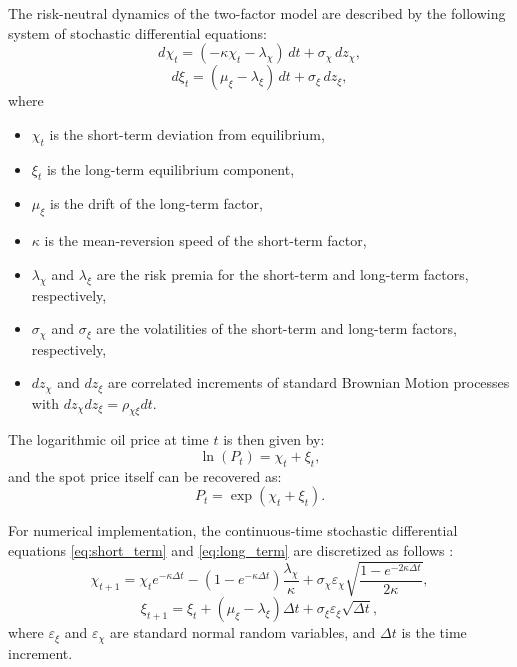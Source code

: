 \documentclass[pdflatex,sn-basic]{sn-jnl}%
\theoremstyle{thmstyleone}%
\theoremstyle{thmstyletwo}%
\theoremstyle{thmstylethree}%
\begin{document}
The risk-neutral dynamics of the two-factor model are described by the following system of stochastic differential equations:
\begin{equation}
    d\chi_t = (-\kappa \chi_t - \lambda_\chi)\,dt + \sigma_\chi\, d z_\chi, 
\label{eq:short_term}
\end{equation}
\begin{equation}
    d\xi_t = (\mu_\xi - \lambda_\xi)\,dt + \sigma_\xi\, d z_\xi, 
\label{eq:long_term}
\end{equation}
where
\begin{itemize}
    \item $\chi_t$ is the short-term deviation from equilibrium,
    \item $\xi_t$ is the long-term equilibrium component,
    \item $\mu_\xi$ is the drift of the long-term factor,
    \item $\kappa$ is the mean-reversion speed of the short-term factor,
    \item $\lambda_\chi$ and $\lambda_\xi$ are the risk premia for the short-term and long-term factors, respectively,
    \item $\sigma_\chi$ and $\sigma_\xi$ are the volatilities of the short-term and long-term factors, respectively,
    \item $d z_\chi$ and $d z_\xi$ are correlated increments of standard Brownian Motion processes with $d z_\chi d z_\xi = \rho_{\chi \xi} dt$.
\end{itemize}

The logarithmic oil price at time $t$ is then given by:
\begin{equation}
    \ln (P_t) = \chi_t + \xi_t,
    \label{eq:log_price}
\end{equation}
and the spot price itself can be recovered as:
\begin{equation}
    P_t = \exp(\chi_t + \xi_t).
    \label{eq:spot_price}
\end{equation}

For numerical implementation, the continuous-time stochastic differential equations \eqref{eq:short_term} and \eqref{eq:long_term} are discretized as follows \citep{ref16, ref21}:
\begin{equation}
    \chi_{t+1} = \chi_t e^{-\kappa \Delta t} - \left(1 - e^{-\kappa \Delta t}\right) \frac{\lambda_\chi}{\kappa} + \sigma_\chi \varepsilon_\chi \sqrt{\frac{1-e^{-2\kappa\Delta t}}{2\kappa}},
    \label{eq:short_term_discrete}
\end{equation}
\begin{equation}
    \xi_{t+1} = \xi_t + (\mu_\xi - \lambda_\xi)\Delta t + \sigma_\xi \varepsilon_\xi \sqrt{\Delta t},
    \label{eq:long_term_discrete}
\end{equation}
where $\varepsilon_\xi$ and $\varepsilon_\chi$ are standard normal random variables, and $\Delta t$ is the time increment.
\end{document}
